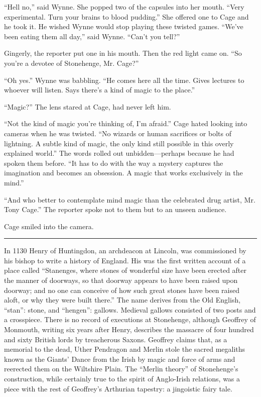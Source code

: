 ``Hell no,'' said Wynne. She popped two of the capsules into her mouth. ``Very experimental. Turn your brains to blood pudding.'' She offered one to Cage and he took it. He wished Wynne would stop playing these twisted games. ``We've been eating them all day,'' said Wynne. ``Can't you tell?''

Gingerly, the reporter put one in his mouth. Then the red light came on. ``So you're a devotee of Stonehenge, Mr. Cage?''

``Oh yes.'' Wynne was babbling. ``He comes here all the time. Gives lectures to whoever will listen. Says there's a kind of magic to the place.''

``Magic?'' The lens stared at Cage, had never left him.

``Not the kind of magic you're thinking of, I'm afraid.'' Cage hated looking into cameras when he was twisted. ``No wizards or human sacrifices or bolts of lightning. A subtle kind of magic, the only kind still possible in this overly explained world.'' The words rolled out unbidden---perhaps because he had spoken them before. ``It has to do with the way a mystery captures the imagination and becomes an obsession. A magic that works exclusively in the mind.''

``And who better to contemplate mind magic than the celebrated drug artist, Mr. Tony Cage.'' The reporter spoke not to them but to an unseen audience.

Cage smiled into the camera.

\fancybreak{* * *}

In 1130 Henry of Huntingdon, an archdeacon at Lincoln, was commissioned by his bishop to write a history of England. His was the first written account of a place called ``Stanenges, where stones of wonderful size have been erected after the manner of doorways, so that doorway appears to have been raised upon doorway; and no one can conceive of how such great stones have been raised aloft, or why they were built there.'' The name derives from the Old English, ``stan'': stone, and ``hengen'': gallows. Medieval gallows consisted of two posts and a crosspiece. There is no record of executions at Stonehenge, although Geoffrey of Monmouth, writing six years after Henry, describes the massacre of four hundred and sixty British lords by treacherous Saxons. Geoffrey claims that, as a memorial to the dead, Uther Pendragon and Merlin stole the sacred megaliths known as the Giants' Dance from the Irish by magic and force of arms and reerected them on the Wiltshire Plain. The ``Merlin theory'' of Stonehenge's construction, while certainly true to the spirit of Anglo-Irish relations, was a piece with the rest of Geoffrey's Arthurian tapestry: a jingoistic fairy tale.

